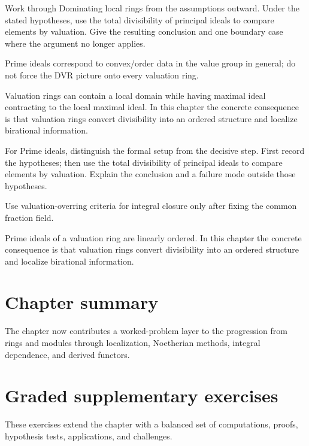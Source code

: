 \begin{exercise}\label{exr:v21-07}
Work through Dominating local rings from the assumptions outward. Under the stated hypotheses, use the total divisibility of principal ideals to compare elements by valuation. Give the resulting conclusion and one boundary case where the argument no longer applies.
\end{exercise}
\begin{hint}
Prime ideals correspond to convex/order data in the value group in general; do not force the DVR picture onto every valuation ring.
\end{hint}
\begin{solution}
Valuation rings can contain a local domain while having maximal ideal contracting to the local maximal ideal. In this chapter the concrete consequence is that valuation rings convert divisibility into an ordered structure and localize birational information.
\end{solution}

\begin{exercise}\label{exr:v21-08}
For Prime ideals, distinguish the formal setup from the decisive step. First record the hypotheses; then use the total divisibility of principal ideals to compare elements by valuation. Explain the conclusion and a failure mode outside those hypotheses.
\end{exercise}
\begin{hint}
Use valuation-overring criteria for integral closure only after fixing the common fraction field.
\end{hint}
\begin{solution}
Prime ideals of a valuation ring are linearly ordered. In this chapter the concrete consequence is that valuation rings convert divisibility into an ordered structure and localize birational information.
\end{solution}

\section*{Chapter summary}
The chapter now contributes a worked-problem layer to the progression from rings and modules through localization, Noetherian methods, integral dependence, and derived functors.
\section{Graded supplementary exercises}
These exercises extend the chapter with a balanced set of computations, proofs, hypothesis tests, applications, and challenges.

